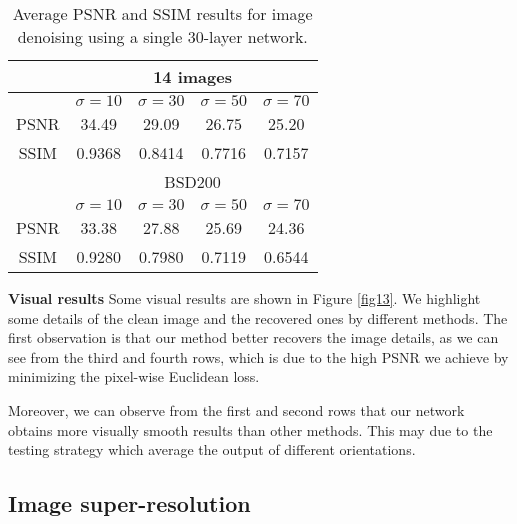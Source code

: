 \begin{table}[b!]
\centering
%
\caption{Average PSNR and SSIM results for image denoising using a single 30-layer network.}
\begin{tabular}{ c|c c c c } \hline
       &\multicolumn{4}{c}{14 images}                     \\ \hline
       &$\sigma=10$ &$\sigma=30$ &$\sigma=50$ &$\sigma=70$ \\ \hline
  PSNR &34.49       &29.09       &26.75       &25.20       \\ \hline
  SSIM &0.9368      &0.8414      &0.7716      &0.7157      \\ \hline
     &\multicolumn{4}{c}{BSD200}                          \\ \hline
       &$\sigma=10$ &$\sigma=30$ &$\sigma=50$ &$\sigma=70$ \\ \hline
  PSNR &33.38       &27.88       &25.69       &24.36       \\ \hline
  SSIM &0.9280      &0.7980      &0.7119      &0.6544      \\ \hline
\end{tabular}
\label{table4}
\end{table}

{\bf{Visual results}} Some visual results are shown in Figure \ref{fig13}. We highlight
some details of the clean image and the recovered ones by different methods. The first
observation is that our method better recovers the image details, as we can see from the
third and fourth rows, which is due to the high PSNR we achieve by minimizing the pixel-wise
Euclidean loss.

 Moreover, we can observe from the first and second rows that our network
obtains more visually smooth results than other methods. This may due to the testing
strategy which average the output of different orientations.

\begin{figure*}
\centering
\subfigure{\texttt{[image: 30-1]} }
\subfigure{\texttt{[image: 30-2]} }
\subfigure{\texttt{[image: 50-1]} }
\subfigure{\texttt{[image: 50-2]} }
\caption{Visual results of image denoising. Images from left to right column are:
clean image; the recovered image of RED30, BM3D, EPLL, NCSR, PCLR, PGPD, WNNM.}
\label{fig13}
\end{figure*}





\subsection{Image super-resolution}


